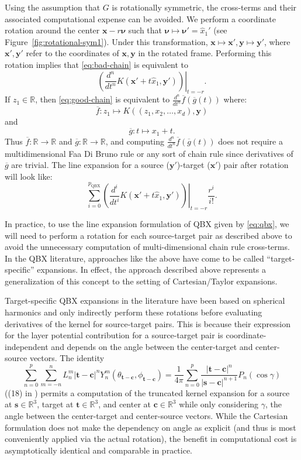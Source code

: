 \documentclass[12pt]{article}
\def\R{{\mathbb R}}
\let\b=\boldsymbol
\theoremstyle{definition}
\theoremstyle{plain}
\theoremstyle{definition}
\begin{document}
Using the assumption that $G$ is rotationally symmetric, the cross-terms and their associated computational expense can be avoided. We perform a coordinate rotation around the center $\b{x}-r \b{\nu}$ such that $\b{\nu} \mapsto \b{\nu'} = \hat x_1'$ (see Figure~\ref{fig:rotational-sym1}). Under this transformation, $\b{x} \mapsto \b{x}', \b{y} \mapsto \b{y}'$, where $\b{x}', \b{y}'$ refer to the coordinates of $\b{x}, \b{y}$ in the rotated frame. Performing this rotation implies that \eqref{eq:bad-chain} is equivalent to
\begin{equation}
\label{eq:good-chain}
\left. \left( \frac{d^n}{dt^n} K(\b{x}' + t\hat x_1, \b{y}')  \right)\right|_{t=-r}.
\end{equation}
If $z_1 \in \R$, then \eqref{eq:good-chain} is equivalent to $\frac{d^n}{dt^n} \overline{f}(\overline{g}(t))$ where:
\[
\overline{f} : z_1 \mapsto K((z_1,x_2, \dots, x_d),\b{y})
\]
and
\[
\overline{g}: t \mapsto x_1 +t.
\]
Thus $\overline{f}: \R \to \R$ and $\overline{g}: \R \to \R$, and computing $\frac{d^n}{dt^n} \overline{f}(\overline{g}(t))$ does not require a multidimensional Faa Di Bruno rule or any sort of chain rule since derivatives of $\overline{g}$ are trivial. The line expansion for a source ($\b{y'}$)-target ($\b{x'}$) pair after rotation will look like:
\begin{equation}
\label{eq:flops}
\sum_{i=0}^{p_{\text{QBX}}} \left. \left( \frac{d^i}{dt^i} K(\b{x}' + t\hat x_1, \b{y}')  \right)\right|_{t=-r} \frac{r^i}{i!}.
\end{equation}

In practice, to use the line expansion formulation of QBX given by \eqref{eq:qbx}, we will need to perform a rotation for each source-target pair as described above to avoid the unnecessary computation of multi-dimensional chain rule cross-terms. In the QBX literature, approaches like the above have come to be called ``target-specific'' expansions. In effect, the approach described above represents a generalization of this concept to the setting of Cartesian/Taylor expansions.

Target-specific QBX expansions in the literature \cite{Siegel_2018,wala2020optimization} have been based on spherical harmonics and only indirectly perform these rotations before evaluating derivatives of the kernel for source-target pairs. This is because their expression for the layer potential contribution for a source-target pair is coordinate-independent and depends on the angle between the center-target and center-source vectors. The identity
\[
\sum_{n=0}^p \sum_{m=-n}^n L^m_n|\b{t}-\b{c}|^n Y^{m}_n(\theta_{\b{t}-\b{c}}, \phi_{\b{t}-\b{c}}) = \frac{1}{4\pi} \sum_{n=0}^p \frac{|\b{t}-\b{c}|^n}{|\b{s}-\b{c}|^{n+1}} P_n(\cos \gamma)
\]
((18) in \cite{wala2020optimization})
permits a computation of the truncated kernel expansion 
for a source at $\b{s} \in \R^3$, target at $\b{t} \in \R^3$, and center at $\b{c} \in \R^3$ while only considering $\gamma$, the angle between the center-target and center-source vectors. While the Cartesian formulation does not make the dependency on angle as explicit (and thus is most conveniently applied via the actual rotation), the benefit in computational cost is asymptotically identical and comparable in practice.
\end{document}
